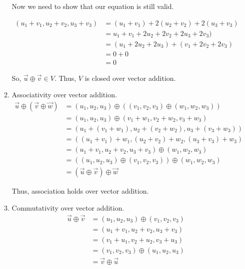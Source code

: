 \documentclass[12pt,letterpaper]{article}
\begin{document}
\begin{enumerate}
\begin{enumerate}
           Now we need to show that our equation is still valid.
           
           \begin{align*}
             (u_1 + v_1, u_2 + v_2, u_3 + v_3) &= (u_1 + v_1) + 2(u_2 + v_2) + 2(u_3 + v_3) \\
             &= u_1 + v_1 + 2u_2 + 2v_2 + 2u_3 + 2v_3) \\
             &= (u_1 + 2u_2 + 2u_3) + (v_1 + 2v_2 + 2v_3) \\
             &= 0 + 0 \\
             &= 0
           \end{align*}
           
           So, $\vec{u} \oplus \vec{v} \in V$.
           Thus, $V$ is closed over vector addition.
           
         \item Associativity over vector addition.
           \begin{align*}
             \vec{u} \oplus (\vec{v} \oplus \vec{w}) &= (u_1, u_2, u_3) \oplus ((v_1, v_2, v_3) \oplus (w_1, w_2, w_3)) \\
             &= (u_1, u_2, u_3) \oplus (v_1 + w_1, v_2 + w_2, v_3 + w_3) \\
             &= (u_1 + (v_1 + w_1), u_2 + (v_2 + w_2), u_3 + (v_3 + w_3)) \\
             &= ((u_1 + v_1) + w_1, (u_2 + v_2) + w_2, (u_3 + v_3) + w_3) \\
             &= (u_1 + v_1, u_2 + v_2, u_3 + v_3) \oplus (w_1, w_2, w_3) \\
             &= ((u_1, u_2, u_3) \oplus (v_1, v_2, v_3)) \oplus (w_1, w_2, w_3) \\
             &= (\vec{u} \oplus \vec{v}) \oplus \vec{w}
           \end{align*}
           
           Thus, association holds over vector addition.
           
         \item Commutativity over vector addition.
           \begin{align*}
             \vec{u} \oplus \vec{v} &= (u_1, u_2, u_3) \oplus (v_1, v_2, v_3) \\
             &= (u_1 + v_1, u_2 + v_2, u_3 + v_3) \\
             &= (v_1 + u_1, v_2 + u_2, v_3 + u_3) \\
             &= (v_1, v_2, v_3) \oplus (u_1, u_2, u_3) \\
             &= \vec{v} \oplus \vec{u}
           \end{align*}
           

\end{enumerate}
\end{enumerate}
\end{document}
